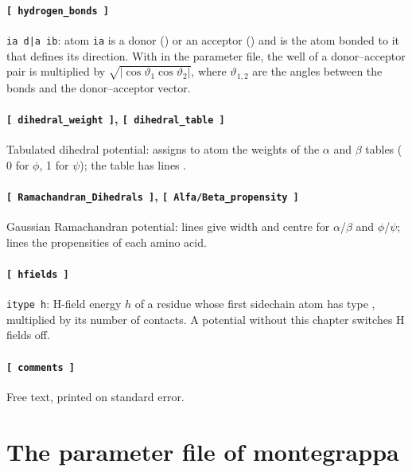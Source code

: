 \documentclass[11pt,a4paper]{article}
\begin{document}
\paragraph{\texttt{[ hydrogen\_bonds ]}} \texttt{ia d|a ib}: atom \texttt{ia} is a donor
() or an acceptor () and  is the atom bonded to it that
defines its direction. With  in the parameter file, the well of a
donor--acceptor pair is multiplied by
$\sqrt{|\cos\vartheta_1\cos\vartheta_2|}$, where $\vartheta_{1,2}$ are the
angles between the bonds and the donor--acceptor vector.

\paragraph{\texttt{[ dihedral\_weight ]}, \texttt{[ dihedral\_table ]}} Tabulated
dihedral potential:  assigns to atom  the weights
of the $\alpha$ and $\beta$ tables ( 0 for $\phi$, 1 for $\psi$);
the table has lines .

\paragraph{\texttt{[ Ramachandran\_Dihedrals ]}, \texttt{[ Alfa/Beta\_propensity ]}}
Gaussian Ramachandran potential: lines  give width
and centre for $\alpha$/$\beta$ and $\phi$/$\psi$; lines  the
propensities of each amino acid.

\paragraph{\texttt{[ hfields ]}} \texttt{itype h}: H-field energy $h$ of a residue
whose first sidechain atom has type , multiplied by its number of
contacts. A potential without this chapter switches H fields off.

\paragraph{\texttt{[ comments ]}} Free text, printed on standard error.

\section{The parameter file of montegrappa}
\label{sec:par}
\end{document}
